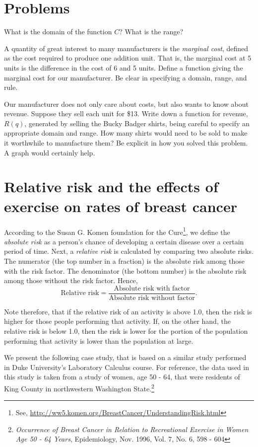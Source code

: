 \section{Problems}
\problemfont
\problem What is the domain of the function $C$?  What is the range?

\problem A quantity of great interest to many manufacturers is the
\textit{marginal cost}, defined as the cost required to produce one
addition unit.  That is, the marginal cost at 5 units is the
difference in the cost of 6 and 5 units.  Define a function giving the
marginal cost for our manufacturer.  Be clear in specifying a domain,
range, and rule.

\problem Our manufacturer does not only care about costs, but also
wants to know about revenue.  Suppose they sell each unit for \$13.
Write down a function for revenue, $R(q)$, generated by selling the
Bucky Badger shirts, being careful to specify an appropriate domain
and range. How many shirts would need to be sold to make it worthwhile
to manufacture them?  Be explicit in how you solved this problem.  A
graph would certainly help.
\noproblemfont


\section{Relative risk and the effects of exercise on rates of breast
cancer}
\label{example:cancer}
According to the Susan G. Komen foundation for the
Cure\footnote{See,
\url{http://ww5.komen.org/BreastCancer/UnderstandingRisk.html}},
we define the \textit{absolute risk} as a person's chance of
developing a certain disease over a certain period of time.  Next, a
\textit{relative risk} is calculated by comparing two absolute
risks. The numerator (the top number in a fraction) is the absolute
risk among those with the risk factor. The denominator (the bottom
number) is the absolute risk among those without the risk factor.
Hence,
\[
\text{Relative risk} = \frac{\text{Absolute risk with
factor}}{\text{Absolute risk without factor}}.
\]

Note therefore, that if the relative risk of an activity is above
1.0, then the risk is higher for those people performing that
activity.  If, on the other hand, the relative risk is below 1.0,
then the risk is lower for the portion of the population performing
that activity is lower than the population at large.\vspace{.2in}

We present the following case study, that is based on a similar
study performed in Duke University's Laboratory Calculus course.
For reference, the data used in this study is taken from a study of
women, age 50 - 64, that were residents of King County in
northwestern Washington State.\footnote{\textit{Occurrence of Breast
Cancer in Relation to Recreational Exercise in Women Age 50 - 64
Years}, Epidemiology, Nov. 1996, Vol. 7, No. 6, 598 - 604}

